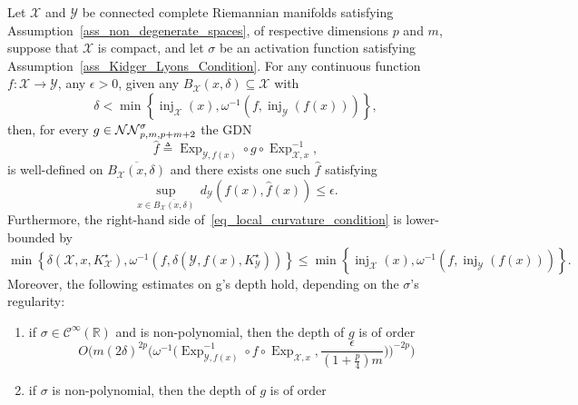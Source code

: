 \documentclass[anon,12pt]{colt2021} %
\newcommand{\xxx}{\mathcal{X}}
\newcommand{\yyy}{\mathcal{Y}}
\begin{document}
\begin{theorem}\label{thrm_main_Local}
Let $\xxx$ and $\yyy$ be connected complete Riemannian manifolds satisfying Assumption~\ref{ass_non_degenerate_spaces}, of respective dimensions $p$ and $m$, suppose that $\xxx$ is compact, and let $\sigma$ be an activation function satisfying Assumption~\ref{ass_Kidger_Lyons_Condition}.  For any continuous function $f:\xxx\rightarrow \yyy$, any $\epsilon>0$, given any $B_{\xxx}(x,\delta)\subseteq \xxx$ with \begin{equation}
\delta < \min\left\{
\operatorname{inj}_{\xxx}(x),
\omega^{-1}\left(f,
\operatorname{inj}_{\yyy}(f(x))
\right)
\right\},
    \label{eq_local_curvature_condition}
\end{equation}
then, for every $g\in \NN[p,m,p+m+2]$ the GDN
\begin{equation}
    \hat{f}\triangleq \operatorname{Exp}_{\yyy,f(x)}\circ g\circ \operatorname{Exp}_{\xxx,x}^{-1},
    \label{eq_non_eucl_NNs_def}
\end{equation}
is well-defined on $\overline{B_{\xxx}(x,\delta)}$ and there exists one such $\hat{f}$ satisfying
$$
\sup_{x \in \overline{
B_{\xxx}\left(
x,\delta
\right)
}} 
\,
d_{\yyy}\left(
f(x),\hat{f}(x)
\right)\leq \epsilon
.
$$  
Furthermore, the right-hand side of~\eqref{eq_local_curvature_condition} is lower-bounded by
\begin{equation}
\min\left\{
\delta(\xxx,x,K^{\star}_{\xxx}),
\omega^{-1}\left(f,
\delta(\yyy,f(x),K^{\star}_{\yyy})
\right)
\right\}
\leq 
\min\left\{
\operatorname{inj}_{\xxx}(x),
\omega^{-1}\left(f,
\operatorname{inj}_{\yyy}(f(x))
\right)
\right\}
\label{eq_generic_lower_bound_Gromov_Application}
.
\end{equation}
Moreover, the following estimates on g's depth hold, depending on the $\sigma$'s regularity:
\begin{enumerate}[label=(i),leftmargin=1.75em]
    \item if $\sigma \in \mathcal{C}^{\infty}(\mathbb{R})$ and is non-polynomial, then the depth of $g$ is of order
    \begin{equation}
        O\bigg(m (2\delta)^{2p} \bigg(\omega^{-1} \big(\operatorname{Exp}_{\yyy,f(x)}^{-1} \circ f \circ \operatorname{Exp}_{\xxx,x}, \frac{\epsilon}{(1+\frac{p}{4})m} \big) \bigg)^{-2p} \bigg)
    \end{equation}
    \item if $\sigma$ is non-polynomial, then the depth of $g$ is of order
    \begin{align}

\end{align}
\end{enumerate}
\end{theorem}
\end{document}
